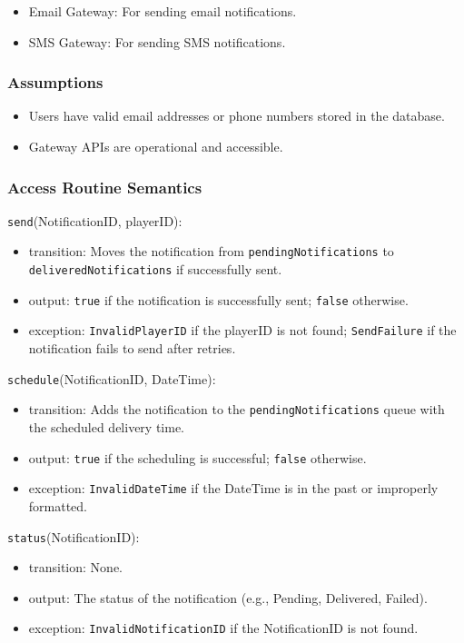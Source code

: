 \documentclass[12pt, titlepage]{article}
\begin{document}
\begin{itemize}
  \item Email Gateway: For sending email notifications.
  \item SMS Gateway: For sending SMS notifications.
\end{itemize}

\subsubsection{Assumptions}

\begin{itemize}
  \item Users have valid email addresses or phone numbers stored in the database.
  \item Gateway APIs are operational and accessible.
\end{itemize}

\subsubsection{Access Routine Semantics}

\noindent \texttt{send}(NotificationID, playerID):
\begin{itemize}
  \item transition: Moves the notification from \texttt{pendingNotifications} to \texttt{deliveredNotifications} if successfully sent.
  \item output: \texttt{true} if the notification is successfully sent; \texttt{false} otherwise.
  \item exception: \texttt{InvalidPlayerID} if the playerID is not found; \texttt{SendFailure} if the notification fails to send after retries.
\end{itemize}

\noindent \texttt{schedule}(NotificationID, DateTime):
\begin{itemize}
  \item transition: Adds the notification to the \texttt{pendingNotifications} queue with the scheduled delivery time.
  \item output: \texttt{true} if the scheduling is successful; \texttt{false} otherwise.
  \item exception: \texttt{InvalidDateTime} if the DateTime is in the past or improperly formatted.
\end{itemize}

\noindent \texttt{status}(NotificationID):
\begin{itemize}
  \item transition: None.
  \item output: The status of the notification (e.g., Pending, Delivered, Failed).
  \item exception: \texttt{InvalidNotificationID} if the NotificationID is not found.
\end{itemize}
\end{document}
